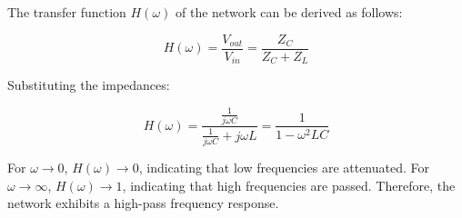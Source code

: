 The transfer function \(H(\omega)\) of the network can be derived as follows:

\[
H(\omega) = \frac{V_{out}}{V_{in}} = \frac{Z_C}{Z_C + Z_L}
\]

Substituting the impedances:

\[
H(\omega) = \frac{\frac{1}{j\omega C}}{\frac{1}{j\omega C} + j\omega L} = \frac{1}{1 - \omega^2 LC}
\]

For \(\omega \to 0\), \(H(\omega) \to 0\), indicating that low frequencies are attenuated. For \(\omega \to \infty\), \(H(\omega) \to 1\), indicating that high frequencies are passed. Therefore, the network exhibits a high-pass frequency response.

